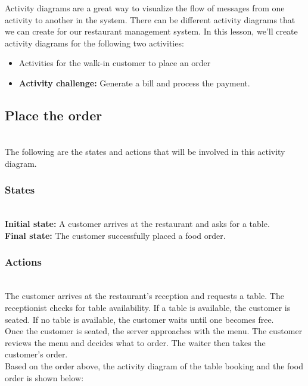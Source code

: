 

Activity diagrams are a great way to visualize the flow of messages from one activity to another in the system. There can be different activity diagrams that we can create for our restaurant management system. In this lesson, we'll create activity diagrams for the following two activities:

\begin{itemize}
\item
\protect{}\label{ISroyW0i2x3dOFospai-Y}
Activities for the walk-in customer to place an order
\item
\protect{}\label{-QVzWTDefKPjpCeGP4gHp}
\textbf{Activity challenge:} Generate a bill and process the payment.
\end{itemize}

\subsection{Place the order}\label{KlJr8r4SjFXwZkWstM52i}
\\
The following are the states and actions that will be involved in this activity diagram.

\subsubsection{States}\label{mUmkuR8KlRUo7ZYtAKarH}
\\
\textbf{Initial state:} A customer arrives at the restaurant and asks for a table.
\\
\textbf{Final state:} The customer successfully placed a food order.

\subsubsection{Actions}\label{Jer-vjNeCJZKMLF4olKAc}
\\
The customer arrives at the restaurant's reception and requests a table. The receptionist checks for table availability. If a table is available, the customer is seated. If no table is available, the customer waits until one becomes free.
\\
Once the customer is seated, the server approaches with the menu. The customer reviews the menu and decides what to order. The waiter then takes the customer's order.
\\
Based on the order above, the activity diagram of the table booking and the food order is shown below:

